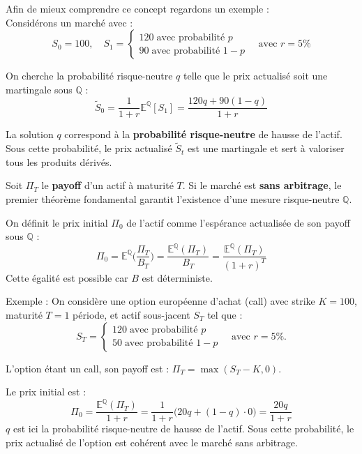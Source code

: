 Afin de mieux comprendre ce concept regardons un exemple : \\
Considérons un marché avec :
\[
S_0 = 100, \quad S_1 = 
\begin{cases}
120 \; \text{avec probabilité $p$} \\
90 \; \text{avec probabilité $1-p$} \end{cases} \quad \text{avec } r = 5\%
\]

On cherche la probabilité risque-neutre $q$ telle que le prix actualisé soit une martingale sous $\mathbb{Q}$ :
$$
\tilde{S}_0 = \frac{1}{1+r}\mathbb{E^Q}[S_1] = \frac{120q + 90(1-q)}{1+r}
$$

La solution $q$ correspond à la \textbf{probabilité risque-neutre} de hausse de l'actif.
Sous cette probabilité, le prix actualisé $\tilde{S}_t$ est une martingale et sert à valoriser tous les produits dérivés.

Soit $\Pi_T$ le \textbf{payoff} d'un actif à maturité $T$.  
Si le marché est \textbf{sans arbitrage}, le premier théorème fondamental garantit l'existence d'une mesure risque-neutre $\mathbb{Q}$.  

On définit le prix initial $\Pi_0$ de l'actif comme l'espérance actualisée de son payoff sous $\mathbb{Q}$ :
$$
\Pi_0 = \mathbb{E}^{\mathbb{Q}}\Big(\frac{\Pi_T}{B_T}\Big) = \frac{\mathbb{E}^{\mathbb{Q}}(\Pi_T)}{B_T} = \frac{\mathbb{E}^{\mathbb{Q}}(\Pi_T)}{(1+r)^T}
$$
Cette égalité est possible car $B$ est déterministe.

Exemple :
On considère une option européenne d'achat (call) avec strike $K = 100$, maturité $T = 1$ période, et actif sous-jacent $S_T$ tel que :
\[
S_T = 
\begin{cases}
120 \; \text{avec probabilité } p \\
50 \; \text{avec probabilité } 1-p
\end{cases} \quad  \text{avec } r = 5\%.
\]

L'option étant un call, son payoff est : $\Pi_T = \max(S_T - K, 0)$.  

Le prix initial est :
$$
\Pi_0 = \frac{\mathbb{E}^{\mathbb{Q}}(\Pi_T)}{1+r} = \frac{1}{1+r} \big(20q + (1-q) \cdot0 \big) = \frac{20q}{1+r}
$$
$q$ est ici la probabilité risque-neutre de hausse de l'actif.  
Sous cette probabilité, le prix actualisé de l'option est cohérent avec le marché sans arbitrage.